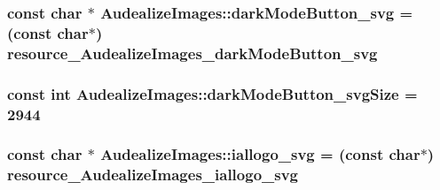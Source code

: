 \subsubsection[{\texorpdfstring{dark\+Mode\+Button\+\_\+svg}{darkModeButton_svg}}]{\setlength{\rightskip}{0pt plus 5cm}const char $\ast$ Audealize\+Images\+::dark\+Mode\+Button\+\_\+svg = (const char$\ast$) resource\+\_\+\+Audealize\+Images\+\_\+dark\+Mode\+Button\+\_\+svg\hspace{0.3cm}{\ttfamily [static]}}\hypertarget{class_audealize_1_1_audealize_images_a648e121e873c0d48aa50001c65ee4383}{}\label{class_audealize_1_1_audealize_images_a648e121e873c0d48aa50001c65ee4383}
\subsubsection[{\texorpdfstring{dark\+Mode\+Button\+\_\+svg\+Size}{darkModeButton_svgSize}}]{\setlength{\rightskip}{0pt plus 5cm}const {\bf int} Audealize\+Images\+::dark\+Mode\+Button\+\_\+svg\+Size = 2944\hspace{0.3cm}{\ttfamily [static]}}\hypertarget{class_audealize_1_1_audealize_images_a3448b57ddf0d2ac3f32012295f0dbc6a}{}\label{class_audealize_1_1_audealize_images_a3448b57ddf0d2ac3f32012295f0dbc6a}
\subsubsection[{\texorpdfstring{iallogo\+\_\+svg}{iallogo_svg}}]{\setlength{\rightskip}{0pt plus 5cm}const char $\ast$ Audealize\+Images\+::iallogo\+\_\+svg = (const char$\ast$) resource\+\_\+\+Audealize\+Images\+\_\+iallogo\+\_\+svg\hspace{0.3cm}{\ttfamily [static]}}\hypertarget{class_audealize_1_1_audealize_images_abaf4f444d78268f7b4655d1edf9b5337}{}\label{class_audealize_1_1_audealize_images_abaf4f444d78268f7b4655d1edf9b5337}
